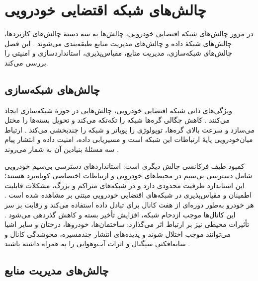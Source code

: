 
\section{چالش‌های شبکه اقتضایی خودرویی}

در مرور چالش‌های شبکه اقتضایی خودرویی، چالش‌ها به سه دستهٔ چالش‌های کاربردها، چالش‌های شبکهٔ داده و چالش‌های مدیریت منابع طبقه‌بندی می‌شوند \cite{hozouriOverviewVANETVehicular2023}. این فصل چالش‌های شبکه‌سازی، مدیریت منابع، مقیاس‌پذیری، استانداردسازی و امنیتی را بررسی می‌کند.

\subsection{چالش‌های شبکه‌سازی}

ویژگی‌های ذاتی شبکه اقتضایی خودرویی، چالش‌هایی در حوزهٔ شبکه‌سازی ایجاد می‌کنند \cite{hozouriOverviewVANETVehicular2023}. کاهش چگالی گره‌ها شبکه را تکه‌تکه می‌کند و تحویل بسته‌ها را مختل می‌سازد و سرعت بالای گره‌ها، توپولوژی را پویاتر و شبکه را چندبخشی می‌کند \cite{hozouriOverviewVANETVehicular2023}. ارتباط میان‌خودرویی  پایهٔ ارتباطات این شبکه است و مسیریابی داده، امنیت داده و انتشار پیام سه مسئلهٔ بنیادین آن به شمار می‌روند \cite{hozouriOverviewVANETVehicular2023}.

کمبود طیف فرکانسی چالش دیگری است: استانداردهای دسترسی بی‌سیم خودرویی شامل دسترسی بی‌سیم در محیط‌های خودرویی  و ارتباطات اختصاصی کوتاه‌برد  هستند؛ این استاندارد ظرفیت محدودی دارد و در شبکه‌های متراکم و بزرگ، مشکلات قابلیت اطمینان و مقیاس‌پذیری در شبکه‌های اقتضایی خودرویی مبتنی بر  مشاهده شده است \cite{hozouriOverviewVANETVehicular2023}. هر خودرو به‌طور دوره‌ای از هفت کانال  برای تبادل داده استفاده می‌کند و رقابت بر سر این کانال‌ها موجب ازدحام شبکه، افزایش تأخیر بسته و کاهش گذردهی می‌شود \cite{hozouriOverviewVANETVehicular2023}. تأثیرات محیطی نیز بر ارتباط اثر می‌گذارد: ساختمان‌ها، خودروها، درختان و سایر اشیا می‌توانند موجب اختلال شوند و پدیده‌های انتشار چندمسیره، محوشدگی کانال و سایه‌افکنی سیگنال و اثرات آب‌وهوایی را به همراه داشته باشند \cite{hozouriOverviewVANETVehicular2023}.

\subsection{چالش‌های مدیریت منابع}

